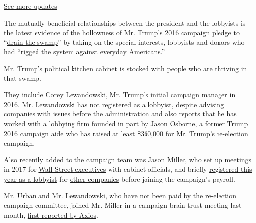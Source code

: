 \href{https://www.nytimes.com/2020/07/31/us/elections/biden-vs-trump.html?action=click\&pgtype=Article\&state=default\&region=MAIN_CONTENT_1\&context=storylines_live_updates}{See
more updates}

The mutually beneficial relationships between the president and the
lobbyists is the latest evidence of the
\href{https://www.nytimes.com/2020/01/26/us/politics/trump-recording-donors.html}{hollowness
of Mr. Trump's 2016 campaign pledge} to
``\href{https://www.nytimes.com/2016/11/11/us/politics/trump-government.html}{drain
the swamp}'' by taking on the special interests, lobbyists and donors
who had ``rigged the system against everyday Americans.''

Mr. Trump's political kitchen cabinet is stocked with people who are
thriving in that swamp.

They include
\href{https://www.nytimes.com/2016/06/21/us/politics/corey-lewandowski-donald-trump.html}{Corey
Lewandowski}, Mr. Trump's initial campaign manager in 2016. Mr.
Lewandowski has not registered as a lobbyist, despite
\href{https://www.nytimes.com/2017/08/01/us/politics/corey-lewandowski-trump.html}{advising
companies} with issues before the administration and also
\href{https://www.politico.com/story/2019/02/13/ryan-zinke-lobbying-firm-1168926}{reports
that he has worked with a lobbying firm} founded in part by Jason
Osborne, a former Trump 2016 campaign aide who has
\href{https://docquery.fec.gov/cgi-bin/forms/C00618389/1379377/sa/3L}{raised
at least \$360,000} for Mr. Trump's re-election campaign.

Also recently added to the campaign team was Jason Miller, who
\href{https://www.documentcloud.org/documents/6609688-DOL-Records-Regarding-the-Conflict-of-Interest.html\#p1048}{set
up meetings} in 2017 for
\href{https://www.documentcloud.org/documents/5686950-Treasury-Secretary-Mnuchin-s-Calendars.html\#p844}{Wall
Street executives} with cabinet officials, and briefly
\href{https://soprweb.senate.gov/index.cfm?event=getFilingDetails\&filingID=40FA8A43-199A-402B-AA00-78B0CF699DFB\&filingTypeID=1}{registered
this year as a lobbyist} for
\href{https://soprweb.senate.gov/index.cfm?event=getFilingDetails\&filingID=85E787FA-E2D7-4FD9-B739-E5BF9A5781F0\&filingTypeID=1}{other
companies} before joining the campaign's payroll.

Mr. Urban and Mr. Lewandowski, who have not been paid by the re-election
campaign committee, joined Mr. Miller in a campaign brain trust meeting
last month,
\href{https://www.axios.com/trump-campaign-internal-polling-f022697e-03cc-4fe0-8aab-cbffd1f74a0c.html}{first
reported by Axios}.


